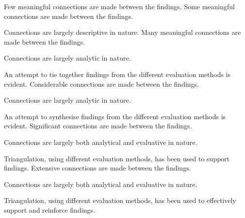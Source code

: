 \documentclass{../../fal_assignment}
\begin{document}
\begin{markingrubric}
%
        \grade \fail	Few meaningful connections are made between the findings.
        \grade 		Some meaningful connections are made between the findings.
        \par     		Connections are largely descriptive in nature.
        \grade		Many meaningful connections are made between the findings.
        \par     		Connections are largely analytic in nature.
        \par		An attempt to tie together findings from the different evaluation methods is evident.
        \grade		Considerable connections are made between the findings.
        \par     		Connections are largely analytic in nature.
        \par		An attempt to synthesise findings from the different evaluation methods is evident.
        \grade		Significant connections are made between the findings.
        \par		Connections are largely both analytical and evaluative in nature.
        \par		Triangulation, using different evaluation methods, has been used to support findings.
        \grade		Extensive connections are made between the findings.
        \par		Connections are largely both analytical and evaluative in nature.
        \par		Triangulation, using different evaluation methods, has been used to effectively support and reinforce findings.


\end{markingrubric}
\end{document}
